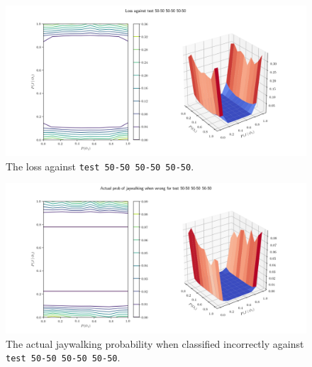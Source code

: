 \documentclass{report}
\newcommand{\code}{\texttt}
\begin{document}
\begin{figure}[h]
    \centering
    \centerline{\includegraphics[scale=0.55]{test_50-50_50-50_50-50_loss.png}}
    \caption[]{The loss against \code{test 50-50 50-50 50-50}.}
    \label{fig:test_50-50_50-50_50-50_loss_plot}
\end{figure}

\begin{figure}[h]
    \centering
    \centerline{\includegraphics[scale=0.55]{test_50-50_50-50_50-50_jay_prob.png}}
    \caption[]{The actual jaywalking probability when classified incorrectly against \code{test 50-50 50-50 50-50}.}
    \label{fig:test_50-50_50-50_50-50_jay_prob_plot}
\end{figure}
\end{document}
